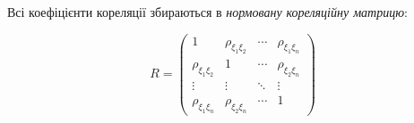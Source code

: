 \begin{definition}
    Всі коефіцієнти кореляції збираються в 
    \emph{нормовану кореляційну матрицю}:

    \begin{equation*}
        R = 
        \begin{pmatrix}
            1 & \rho_{\xi_1\xi_2} & \cdots & \rho_{\xi_1\xi_n} \\
            \rho_{\xi_1\xi_2} & 1 & \cdots & \rho_{\xi_2\xi_n} \\
            \vdots & \vdots & \ddots & \vdots \\
            \rho_{\xi_1\xi_n} & \rho_{\xi_2\xi_n} & \cdots & 1
        \end{pmatrix}
    \end{equation*}

\end{definition}

